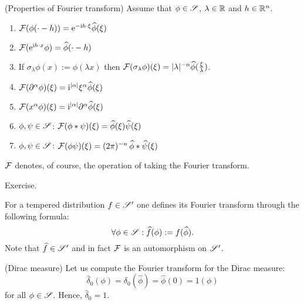 \documentclass[11pt]{article}
\begin{document}
			\begin{prop}\label{prop--fourier}
				(Properties of Fourier transform) Assume that $\phi\in\mathscr{S}$, $\lambda\in\mathbb{R}$ and $h\in\mathbb{R}^n$.
				\begin{enumerate}
					\item $\mathcal{F}(\phi(\cdot -h))=\mathrm{e}^{-\mathrm{i} h\cdot\xi}\widehat{\phi}(\xi)$
					\item $\mathcal{F}(\mathrm{e}^{\mathrm{i} h\cdot x}\phi)=\widehat{\phi}(\cdot-h)$
					\item If $\sigma_\lambda\phi(x):=\phi(\lambda x)$ then $\mathcal{F}(\sigma_\lambda\phi)(\xi)=|\lambda|^{-n}\widehat{\phi}(\frac{\xi}{\lambda})$.
					\item $\mathcal{F}(\partial^\alpha\phi)(\xi)=\mathrm{i}^{|\alpha|}\xi^\alpha\widehat{\phi}(\xi)$
					\item $\mathcal{F}(x^\alpha\phi)(\xi)=\mathrm{i}^{|\alpha|}\partial^\alpha\widehat{\phi}(\xi)$
					\item $\phi,\psi\in\mathscr{S}$: $\mathcal{F}(\phi\ast\psi)(\xi)=\widehat{\phi}(\xi)\widehat{\psi}(\xi)$
					\item $\phi,\psi\in\mathscr{S}$: $\mathcal{F}(\phi\psi)(\xi)=(2\pi)^{-n}\,\widehat{\phi}\ast\widehat{\psi}(\xi)$
				\end{enumerate}
				$\mathcal{F}$ denotes, of course, the operation of taking the Fourier transform.
			\end{prop}
			\begin{pproof}
				Exercise.
			\end{pproof}

			\begin{defi}
				For a tempered distribution $f\in\mathscr{S}^\prime$ one defines its Fourier transform through the following formula:
				\begin{equation*}
					\forall\phi\in\mathscr{S}: \widehat{f}(\phi):=f(\widehat{\phi}).
				\end{equation*}
				Note that $\widehat{f}\in\mathscr{S}^\prime$ and in fact $\mathcal{F}$ is an automorphism on $\mathscr{S}^\prime$.
			\end{defi}

			\begin{eg}
				(Dirac measure) Let us compute the Fourier transform for the Dirac measure:
				\begin{equation*}
					\hat{\delta}_0(\phi)=\delta_0(\hat{\phi})=\hat{\phi}(0)=1(\phi)
				\end{equation*}
				for all $\phi\in\mathscr{S}$. Hence, $\hat{\delta}_0=1$.
			\end{eg}
\end{document}
